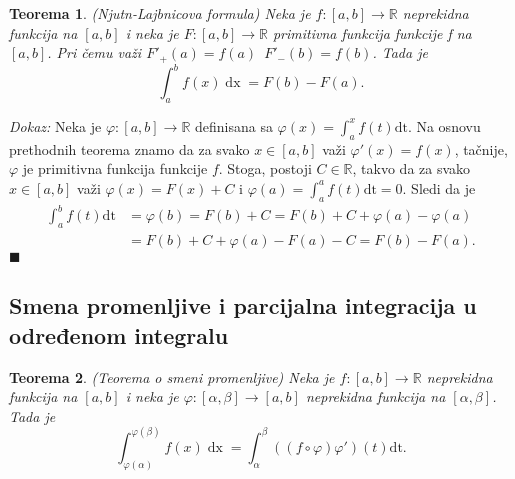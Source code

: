 \documentclass{article}
\newtheorem{teorema}{Teorema}[section]
\DeclareMathOperator{\dx}{dx}
\begin{document}
\begin{teoremabox}
    \label{teorema_2.9}
    \begin{teorema}
        (Njutn-Lajbnicova formula) Neka je $f:\left[a, b\right]\longrightarrow \mathbb{R}$ neprekidna funkcija na $\left[a,b\right]$ i neka je $F:\left[a, b\right]\longrightarrow\mathbb{R}$ primitivna funkcija funkcije f na $\left[a,b\right]$. Pri čemu važi $F'_+ \left(a\right) = f\left(a\right)\,\,\,F'_-\left(b\right) = f\left(b\right)$. Tada je
        $$ \int^b_a f\left(x\right)\dx = F\left(b\right) - F\left(a\right).$$
    \end{teorema}
\end{teoremabox}

\textit{Dokaz:} Neka je $\varphi: \left[a, b\right] \longrightarrow \mathbb{R}$ definisana sa
$\varphi\left(x\right) = \displaystyle\int^x_a f\left(t\right)\text{dt}$. Na osnovu prethodnih teorema znamo da za svako $x\in \left[a, b\right]$ važi $\varphi'\left(x\right) = f\left(x\right)$,
tačnije, $\varphi$ je primitivna funkcija funkcije $f$. Stoga, postoji
$C \in \mathbb{R}$, takvo da za svako $x \in \left[a, b\right]$ važi
$\varphi\left(x\right) = F\left(x\right) + C$ i $\displaystyle\varphi\left(a\right)=\int_{a}^{a} f\left(t\right)\text{dt}=0$. Sledi da je
\begin{align*}
    \displaystyle\int^b_a f\left(t\right)\text{dt} & = \varphi\left(b\right) = F\left(b\right) + C = F\left(b\right) +C+ \varphi\left(a\right) - \varphi\left(a\right) \\
                                                   & = F\left(b\right) +C+ \varphi\left(a\right) - F\left(a\right)-C = F\left(b\right) - F\left(a\right).
\end{align*}
\null\hfill $\blacksquare$\par

\subsection{Smena promenljive i parcijalna integracija u određenom integralu}

\begin{teoremabox}
    \label{teorema_2.10}
    \begin{teorema}
        (Teorema o smeni promenljive) Neka je $f:\left[a, b\right]\longrightarrow \mathbb{R}$ neprekidna funkcija na $\left[a,b\right]$ i neka je $\varphi: \left[\alpha, \beta\right] \longrightarrow \left[a, b\right]$ neprekidna funkcija na $\left[\alpha, \beta\right]$. Tada je
        $$\displaystyle \int^{\varphi\left(\beta\right)}_{\varphi\left(\alpha\right)} f\left(x\right)\dx = \int^\beta_\alpha \left(\left(f\circ\varphi\right)\varphi'\right)\left(t\right)\text{dt}.$$
    \end{teorema}
\end{teoremabox}
\end{document}
